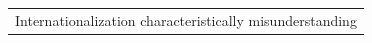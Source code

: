 \documentclass{article}
\begin{document}
\begin{tabular}{p{2.5cm}}
Internationalization characteristically misunderstanding
\end{tabular}
\end{document}
